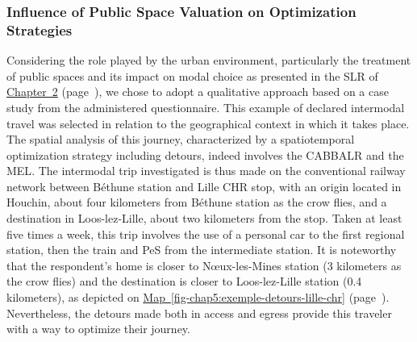 \begin{refsegment}
\subsubsection*{Influence of Public Space Valuation on Optimization Strategies
    \label{chap5:environnement-urbain}
    }

Considering the role played by the urban environment, particularly the treatment of public spaces and its impact on modal choice as presented in the \acrfull{SLR} of \hyperref[chap2:titre]{Chapter~2} (page~\pageref{chap2:titre}), we chose to adopt a qualitative approach based on a case study from the administered questionnaire. This example of declared intermodal travel was selected in relation to the geographical context in which it takes place. The spatial analysis of this journey, characterized by a spatiotemporal optimization strategy including detours, indeed involves the \acrshort{CABBALR} and the \acrshort{MEL}. The intermodal trip investigated is thus made on the conventional railway network between Béthune station and Lille CHR stop, with an origin located in Houchin, about four kilometers from Béthune station as the crow flies, and a destination in Loos-lez-Lille, about two kilometers from the stop. Taken at least five times a week, this trip involves the use of a personal car to the first regional station, then the train and \acrshort{PeS} from the intermediate station. It is noteworthy that the respondent's home is closer to Nœux-les-Mines station (3 kilometers as the crow flies) and the destination is closer to Loos-lez-Lille station (0.4 kilometers), as depicted on \hyperref[fig-chap5:exemple-detours-lille-chr]{Map~\ref{fig-chap5:exemple-detours-lille-chr}} (page~\pageref{fig-chap5:exemple-detours-lille-chr}). Nevertheless, the detours made both in access and egress provide this traveler with a way to optimize their journey.%


\end{refsegment}
